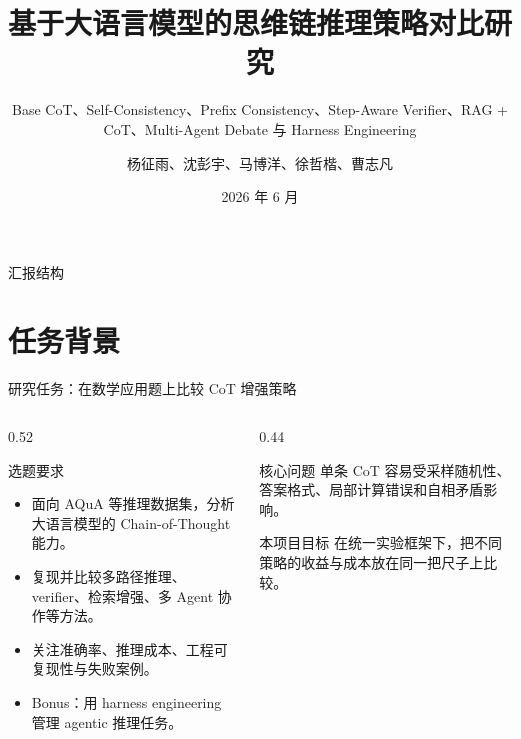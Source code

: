 \documentclass[10pt,aspectratio=169]{beamer}
\title[nlp-cot]{基于大语言模型的思维链推理策略对比研究}
\subtitle{Base CoT、Self-Consistency、Prefix Consistency、Step-Aware Verifier、RAG + CoT、Multi-Agent Debate 与 Harness Engineering}
\author[汇报人：沈彭宇、马博洋、曹志凡]{杨征雨、沈彭宇、马博洋、徐哲楷、曹志凡}
\institute[ZJU]{汇报人：沈彭宇、马博洋、曹志凡 \\ 浙江大学 \quad 自然语言处理导论课程大作业}
\date{2026 年 6 月}
\newcommand{\tightitems}{\setlength{\itemsep}{0.24em}}
\begin{document}
\begin{frame}
  \titlepage
\end{frame}

\begin{frame}{汇报结构}
  \tableofcontents
\end{frame}

\section{任务背景}

\begin{frame}{研究任务：在数学应用题上比较 CoT 增强策略}
  \begin{columns}[T,onlytextwidth]
    \begin{column}{0.52\textwidth}
      \begin{block}{选题要求}
        \begin{itemize}
          \tightitems
          \item 面向 AQuA 等推理数据集，分析大语言模型的 Chain-of-Thought 能力。
          \item 复现并比较多路径推理、verifier、检索增强、多 Agent 协作等方法。
          \item 关注准确率、推理成本、工程可复现性与失败案例。
          \item Bonus：用 harness engineering 管理 agentic 推理任务。
        \end{itemize}
      \end{block}
    \end{column}
    \begin{column}{0.44\textwidth}
      \begin{alertblock}{核心问题}
        单条 CoT 容易受采样随机性、答案格式、局部计算错误和自相矛盾影响。
      \end{alertblock}
      \begin{block}{本项目目标}
        在统一实验框架下，把不同策略的收益与成本放在同一把尺子上比较。
      \end{block}
    \end{column}
  \end{columns}
\end{frame}
\end{document}
